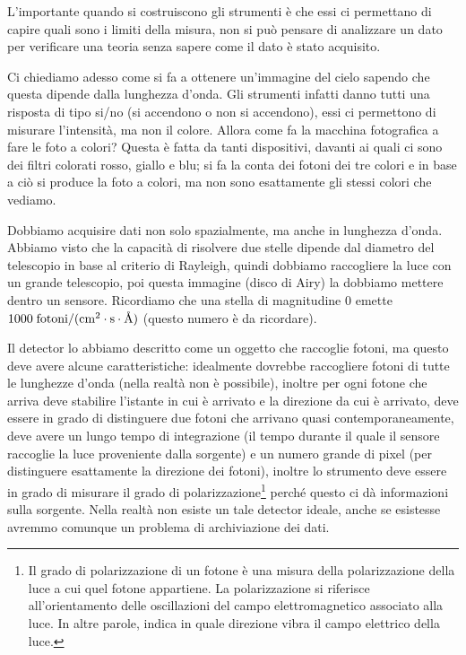 L'importante quando si costruiscono gli strumenti è che essi ci permettano di capire quali sono i limiti della misura, non si può pensare di analizzare un dato per verificare una teoria senza sapere come il dato è stato acquisito.

\vspace{0.2cm}Ci chiediamo adesso come si fa a ottenere un'immagine del cielo sapendo che questa dipende dalla lunghezza d'onda. Gli strumenti infatti danno tutti una risposta di tipo si/no (si accendono o non si accendono), essi ci permettono di misurare l'intensità, ma non il colore. Allora come fa la macchina fotografica a fare le foto a colori? Questa è fatta da tanti dispositivi, davanti ai quali ci sono dei filtri colorati rosso, giallo e blu; si fa la conta dei fotoni dei tre colori e in base a ciò si produce la foto a colori, ma non sono esattamente gli stessi colori che vediamo.

Dobbiamo acquisire dati non solo spazialmente, ma anche in lunghezza d'onda. Abbiamo visto che la capacità di risolvere due stelle dipende dal diametro del telescopio in base al criterio di Rayleigh, quindi dobbiamo raccogliere la luce con un grande telescopio, poi questa immagine (disco di Airy) la dobbiamo mettere dentro un sensore. Ricordiamo che una stella di magnitudine $0$ emette $\rm 1000 \; fotoni/(cm^2 \cdot s \cdot \text{Å})$ (questo numero è da ricordare).

\vspace{0.2cm}Il detector lo abbiamo descritto come un oggetto che raccoglie fotoni, ma questo deve avere alcune caratteristiche: idealmente dovrebbe raccogliere fotoni di tutte le lunghezze d'onda (nella realtà non è possibile), inoltre per ogni fotone che arriva deve stabilire l'istante in cui è arrivato e la direzione da cui è arrivato, deve essere in grado di distinguere due fotoni che arrivano quasi contemporaneamente, deve avere un lungo tempo di integrazione (il tempo durante il quale il sensore raccoglie la luce proveniente dalla sorgente) e un numero grande di pixel (per distinguere esattamente la direzione dei fotoni), inoltre lo strumento deve essere in grado di misurare il grado di polarizzazione\footnote{Il grado di polarizzazione di un fotone è una misura della polarizzazione della luce a cui quel fotone appartiene. La polarizzazione si riferisce all'orientamento delle oscillazioni del campo elettromagnetico associato alla luce. In altre parole, indica in quale direzione vibra il campo elettrico della luce.} perché questo ci dà informazioni sulla sorgente. Nella realtà non esiste un tale detector ideale, anche se esistesse avremmo comunque un problema di archiviazione dei dati.

